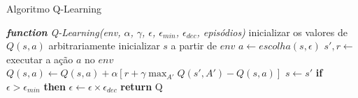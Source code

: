 \documentclass{beamer}
\begin{document}
\begin{frame}{Algoritmo Q-Learning}
	
\begin{algorithmic} 
	\STATE \emph{\textbf{function} Q-Learning(env, $\alpha$, $\gamma$, $\epsilon$, $\epsilon_{min}$, $\epsilon_{dec}$, episódios)}
	\STATE inicializar os valores de $Q(s, a)$ arbitrariamente
	\STATE inicializar $s$ a partir de $env$
	\REPEAT
	\STATE $a \leftarrow escolha(s, \epsilon)$
	\STATE $s', r \leftarrow$ executar a ação $a$ no $env$
	\STATE $Q(s,a) \leftarrow Q(s,a) + \alpha [r +\gamma \max_{A'}{Q(s', A')} - Q(s,a)]$
	\STATE$s  \leftarrow s'$
	\STATE \textbf{if} $\epsilon > \epsilon_{min}$ \textbf{then} $\epsilon \leftarrow \epsilon \times \epsilon_{dec}$
	\ENDFOR
	\STATE \textbf{return} Q
\end{algorithmic}	
\end{frame}

%	
%	
%	
%
%		
%	
%
\end{document}
